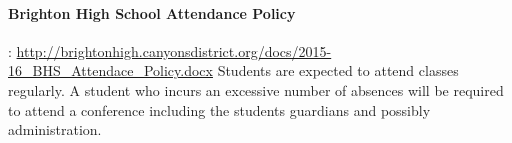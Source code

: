 \documentclass[12pt]{article}
\newcommand{\MTWHFClass}{%
\calday[Monday]{\classday} %
\calday[Tuesday]{\classday} %
\calday[Wednesday]{\classday} %
\calday[Thursday]{\classday} %
\calday[Friday]{\classday} %
\skipday\skipday %
}
\newcommand{\Holiday}[2]{%
\options{#1}{\noclassday}
\caltext{#1}{#2}
}
\begin{document}
\paragraph*{Brighton High School Attendance Policy}:  \url{http://brightonhigh.canyonsdistrict.org/docs/2015-16_BHS_Attendace_Policy.docx}
Students are expected to attend classes regularly. A student who incurs an excessive
number of absences will be required to attend a conference including the students guardians and possibly administration.


%
%
\end{document}
